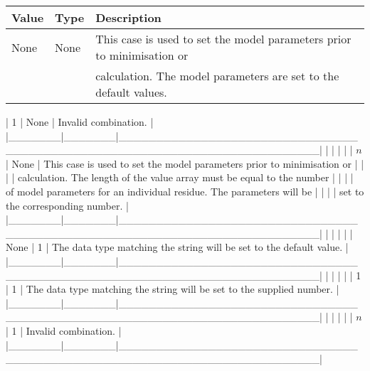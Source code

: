 \begin{center}
\begin{tabular}{lll}
\toprule
Value & Type & Description \\
\midrule
None & None & This case is used to set the model parameters prior to minimisation or \\
 &  & calculation.  The model parameters are set to the default values. \\
\bottomrule
\end{tabular}
\end{center}

|   1   | None  | Invalid combination.                                                     |
|\_\_\_\_\_\_\_|\_\_\_\_\_\_\_|\_\_\_\_\_\_\_\_\_\_\_\_\_\_\_\_\_\_\_\_\_\_\_\_\_\_\_\_\_\_\_\_\_\_\_\_\_\_\_\_\_\_\_\_\_\_\_\_\_\_\_\_\_\_\_\_\_\_\_\_\_\_\_\_\_\_\_\_\_\_\_\_\_\_|
|       |       |                                                                          |
|   $n$   | None  | This case is used to set the model parameters prior to minimisation or   |
|       |       | calculation.  The length of the value array must be equal to the number  |
|       |       | of model parameters for an individual residue.  The parameters will be   |
|       |       | set to the corresponding number.                                         |
|\_\_\_\_\_\_\_|\_\_\_\_\_\_\_|\_\_\_\_\_\_\_\_\_\_\_\_\_\_\_\_\_\_\_\_\_\_\_\_\_\_\_\_\_\_\_\_\_\_\_\_\_\_\_\_\_\_\_\_\_\_\_\_\_\_\_\_\_\_\_\_\_\_\_\_\_\_\_\_\_\_\_\_\_\_\_\_\_\_|
|       |       |                                                                          |
| None  |   1   | The data type matching the string will be set to the default value.      |
|\_\_\_\_\_\_\_|\_\_\_\_\_\_\_|\_\_\_\_\_\_\_\_\_\_\_\_\_\_\_\_\_\_\_\_\_\_\_\_\_\_\_\_\_\_\_\_\_\_\_\_\_\_\_\_\_\_\_\_\_\_\_\_\_\_\_\_\_\_\_\_\_\_\_\_\_\_\_\_\_\_\_\_\_\_\_\_\_\_|
|       |       |                                                                          |
|   1   |   1   | The data type matching the string will be set to the supplied number.    |
|\_\_\_\_\_\_\_|\_\_\_\_\_\_\_|\_\_\_\_\_\_\_\_\_\_\_\_\_\_\_\_\_\_\_\_\_\_\_\_\_\_\_\_\_\_\_\_\_\_\_\_\_\_\_\_\_\_\_\_\_\_\_\_\_\_\_\_\_\_\_\_\_\_\_\_\_\_\_\_\_\_\_\_\_\_\_\_\_\_|
|       |       |                                                                          |
|   $n$   |   1   | Invalid combination.                                                     |
|\_\_\_\_\_\_\_|\_\_\_\_\_\_\_|\_\_\_\_\_\_\_\_\_\_\_\_\_\_\_\_\_\_\_\_\_\_\_\_\_\_\_\_\_\_\_\_\_\_\_\_\_\_\_\_\_\_\_\_\_\_\_\_\_\_\_\_\_\_\_\_\_\_\_\_\_\_\_\_\_\_\_\_\_\_\_\_\_\_|
